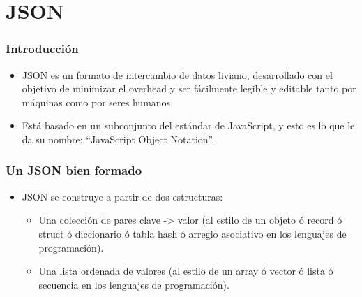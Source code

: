 \section{JSON}
\begin{frame}
\frametitle{Introducción}
\begin{itemize}
\item	JSON es un formato de intercambio de datos liviano, desarrollado con el objetivo de minimizar el overhead y ser fácilmente legible y editable tanto por máquinas como por seres humanos.
		\pause
\item	Está basado en un subconjunto del estándar de JavaScript, y esto es lo que le da su nombre: ``JavaScript Object Notation''.
\end{itemize}
\end{frame}

\begin{frame}
\frametitle{Un JSON bien formado}
\begin{itemize}
\item	JSON se construye a partir de dos estructuras:
		\pause
\begin{itemize}
		\item	Una colección de pares clave -> valor (al estilo de un objeto ó record ó struct ó diccionario ó tabla hash ó arreglo asociativo en los lenguajes de programación).
				\pause
		\item	Una lista ordenada de valores (al estilo de un array ó vector ó lista ó secuencia en los lenguajes de programación).
\end{itemize}
\end{itemize}
\end{frame}

